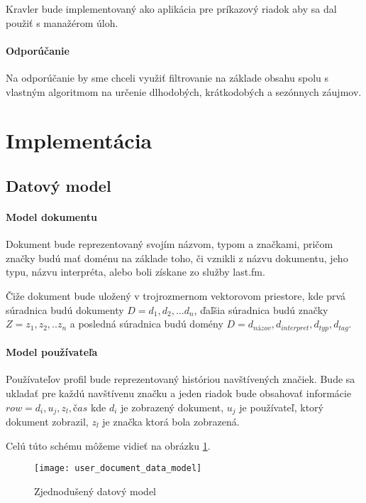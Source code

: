 Kravler bude implementovaný ako aplikácia pre príkazový riadok
aby sa dal použiť s manažérom úloh.

\paragraph{Odporúčanie}

Na odporúčanie by sme chceli využiť filtrovanie na základe obsahu
spolu s vlastným algoritmom na určenie dlhodobých, krátkodobých a
sezónnych záujmov.


\newpage

\section{Implementácia}

\subsection{Datový model}

\paragraph{Model dokumentu}

Dokument bude reprezentovaný svojím názvom, typom a značkami,
pričom značky budú mať doménu na základe toho, či vznikli
z názvu dokumentu, jeho typu, názvu interpréta, alebo
boli získane zo služby last.fm.

Čiže dokument bude uložený v trojrozmernom vektorovom priestore,
kde prvá súradnica budú dokumenty \(D = {d_1, d_2,... d_n}\),
ďaľšia súradnica budú značky \(Z = {z_1, z_2,.. z_n}\) a posledná 
súradnica budú domény \(D = {d_{názov}, d_{interpret}, d_{typ}, d_{tag}}\).

\paragraph{Model používateľa}

Používateľov profil bude reprezentovaný históriou navštívených značiek.
Bude sa ukladať pre každú navštívenu značku a jeden riadok bude obsahovať 
informácie \(row = {d_i, u_j, z_l, čas}\) kde \(d_i\) je zobrazený dokument,
\(u_j\) je používateľ, ktorý dokument zobrazil, \(z_l\) je značka ktorá bola zobrazená.

Celú túto schému môžeme vidieť na obrázku \ref{fig:user_document_data_model}.


\begin{figure}
    \begin{center}
        \texttt{[image: user\_document\_data\_model]}
        \caption{Zjednodušený datový model}
        \label{fig:user_document_data_model}
    \end{center}
\end{figure}

